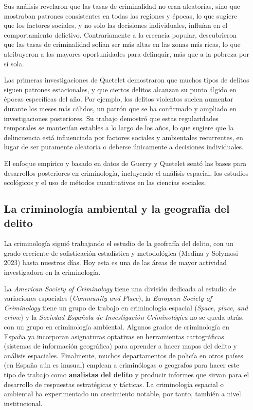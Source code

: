 \documentclass[
  spanish,
  letterpaper,
  DIV=11,
  numbers=noendperiod]{scrreprt}
\begin{document}
Sus análisis revelaron que las tasas de criminalidad no eran aleatorias,
sino que mostraban patrones consistentes en todas las regiones y épocas,
lo que sugiere que los factores sociales, y no solo las decisiones
individuales, influían en el comportamiento delictivo. Contrariamente a
la creencia popular, descubrieron que las tasas de criminalidad solían
ser más altas en las zonas más ricas, lo que atribuyeron a las mayores
oportunidades para delinquir, más que a la pobreza por sí sola.

Las primeras investigaciones de Quetelet demostraron que muchos tipos de
delitos siguen patrones estacionales, y que ciertos delitos alcanzan su
punto álgido en épocas específicas del año. Por ejemplo, los delitos
violentos suelen aumentar durante los meses más cálidos, un patrón que
se ha confirmado y ampliado en investigaciones posteriores. Su trabajo
demostró que estas regularidades temporales se mantenían estables a lo
largo de los años, lo que sugiere que la delincuencia está influenciada
por factores sociales y ambientales recurrentes, en lugar de ser
puramente aleatoria o deberse únicamente a decisiones individuales.

El enfoque empírico y basado en datos de Guerry y Quetelet sentó las
bases para desarrollos posteriores en criminología, incluyendo el
análisis espacial, los estudios ecológicos y el uso de métodos
cuantitativos en las ciencias sociales.

\subsection{La criminología ambiental y la geografía del
delito}\label{la-criminologuxeda-ambiental-y-la-geografuxeda-del-delito}

La criminología siguió trabajando el estudio de la geofrafía del delito,
con un grado creciente de sofisticación estadística y metodológica
(Medina y Solymosi 2023) hasta nuestros días. Hoy esta es una de las
áreas de mayor actividad investigadora en la criminología.

La \emph{American Society of Criminology} tiene una división dedicada al
estudio de variaciones espaciales (\emph{Community and Place}), la
\emph{European Society of Criminology} tiene un grupo de trabajo en
criminologia espacial (\emph{Space, place, and crime}) y la
\emph{Sociedad Española de Investigación Criminológica} no se queda
atrás, con un grupo en criminología ambiental. Algunos grados de
criminología en España ya incorporan asignaturas optativas en
herramientas cartográficas (sistemas de información geográfica) para
aprender a hacer mapas del delito y análisis espaciales. Finalmente,
muchos departamentos de policía en otros países (en España aún es
inusual) emplean a criminólogas o geografos para hacer este tipo de
trabajo como \textbf{analistas del delito} y producir informes que
sirvan para el desarrollo de respuestas estratégicas y tácticas. La
criminología espacial o ambiental ha experimentado un crecimiento
notable, por tanto, también a nivel institucional.
\end{document}
